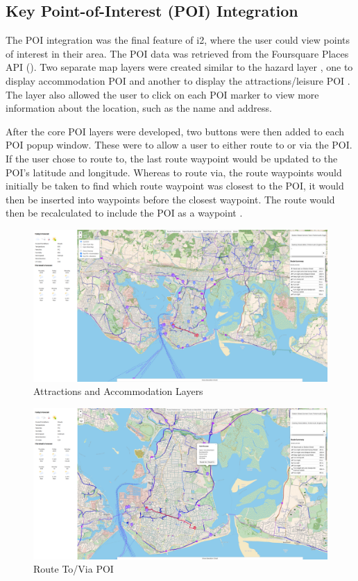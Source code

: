 \subsection{Key Point-of-Interest (POI) Integration}
\label{iteration2:poi-integration}

The POI integration was the final feature of i2, where the user could view points of interest in their area. The POI data was retrieved from the Foursquare Places API (\cite{noauthor_places_nodate}). Two separate map layers were created similar to the hazard layer , one to display accommodation POI and another to display the attractions/leisure POI . The layer also allowed the user to click on each POI marker to view more information about the location, such as the name and address.

After the core POI layers were developed, two buttons were then added to each POI popup window. These were to allow a user to either route to or via the POI. If the user chose to route to, the last route waypoint would be updated to the POI's latitude and longitude. Whereas to route via, the route waypoints would initially be taken to find which route waypoint was closest to the POI, it would then be inserted into waypoints before the closest waypoint. The route would then be recalculated to include the POI as a waypoint .

\begin{figure}[!ht]
  \centering
  \includegraphics[width=425px]{figures/Progress Images/Iteration-2/SR40-45/SR40 - Attractions and Accommodation KeyPOI.png}
  \caption{Attractions and Accommodation Layers}
  \label{fig:poi-layers}
\end{figure}

\begin{figure}[!ht]
  \centering
  \includegraphics[width=425px]{figures/Progress Images/Iteration-2/SR40-45/SR45 - Route ToVia POI.png}
  \caption{Route To/Via POI}
  \label{fig:poi-route}
\end{figure}

